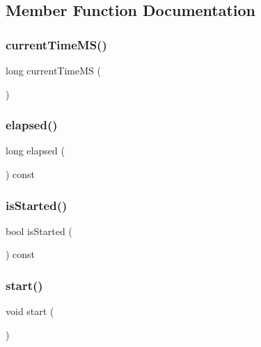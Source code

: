 \subsection{Member Function Documentation}
\mbox{\label{classTimer_a15da52f140db2287f84e933d49314a11}} 
\subsubsection{\texorpdfstring{current\+Time\+M\+S()}{currentTimeMS()}}
{\footnotesize\ttfamily long current\+Time\+MS (\begin{DoxyParamCaption}{ }\end{DoxyParamCaption})\hspace{0.3cm}{\ttfamily [static]}}

\mbox{\label{classTimer_a4c3fc68815831690cadc2f7cc65890fb}} 
\subsubsection{\texorpdfstring{elapsed()}{elapsed()}}
{\footnotesize\ttfamily long elapsed (\begin{DoxyParamCaption}{ }\end{DoxyParamCaption}) const}

\mbox{\label{classTimer_ac1991ea0e286fbb461b60c8c9299d781}} 
\subsubsection{\texorpdfstring{is\+Started()}{isStarted()}}
{\footnotesize\ttfamily bool is\+Started (\begin{DoxyParamCaption}{ }\end{DoxyParamCaption}) const}

\mbox{\label{classTimer_a60de64d75454385b23995437f1d72669}} 
\subsubsection{\texorpdfstring{start()}{start()}}
{\footnotesize\ttfamily void start (\begin{DoxyParamCaption}{ }\end{DoxyParamCaption})}

